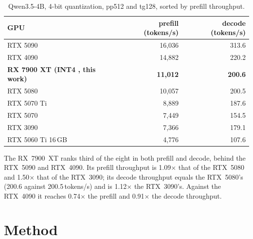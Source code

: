\documentclass[10.5pt,a4paper]{article}
\newcommand{\tx}[1]{\texttt{\detokenize{#1}}}
\begin{document}
\begin{table}[H]
\centering\small
\begin{tabular}{@{}lrr@{}}
\toprule
GPU & prefill (tokens/s) & decode (tokens/s)\\
\midrule
RTX 5090 & 16{,}036 & 313.6\\
RTX 4090 & 14{,}882 & 220.2\\
\textbf{RX 7900 XT (INT4 \tx{fast}, this work)} & \textbf{11{,}012} & \textbf{200.6}\\
RTX 5080 & 10{,}057 & 200.5\\
RTX 5070 Ti & 8{,}889 & 187.6\\
RTX 5070 & 7{,}449 & 154.5\\
RTX 3090 & 7{,}366 & 179.1\\
RTX 5060 Ti 16\,GB & 4{,}776 & 107.6\\
\bottomrule
\end{tabular}
\caption{Qwen3.5-4B, 4-bit quantization, pp512 and tg128, sorted by prefill throughput.}
\end{table}

The RX~7900~XT ranks third of the eight in both prefill and decode, behind the RTX~5090 and RTX~4090. Its prefill throughput is 1.09$\times$ that of the RTX~5080 and 1.50$\times$ that of the RTX~3090;
its decode throughput equals the RTX~5080's (200.6 against 200.5\,tokens/s) and is 1.12$\times$ the RTX~3090's. Against the RTX~4090 it reaches 0.74$\times$ the prefill and 0.91$\times$ the decode throughput.

\section{Method}
\label{sec:method}
\end{document}
